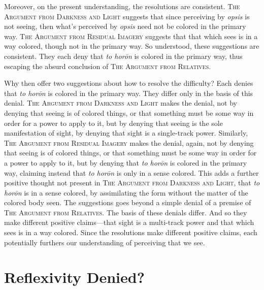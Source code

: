 Moreover, on the present understanding, the resolutions are consistent. \textsc{The Argument from Darkness and Light} suggests that since perceiving by \emph{opsis} is not seeing, then what's perceived by \emph{opsis} need not be colored in the primary way. \textsc{The Argument from Residual Imagery} suggests that that which sees is in a way colored, though not in the primary way. So understood, these suggestions are consistent. They each deny that \emph{to horōn} is colored in the primary way, thus escaping the absurd conclusion of \textsc{The Argument from Relatives}.

Why then offer two suggestions about how to resolve the difficulty? Each denies that \emph{to horōn} is colored in the primary way. They differ only in the basis of this denial. \textsc{The Argument from Darkness and Light} makes the denial, not by denying that seeing is of colored things, or that something must be some way in order for a power to apply to it, but by denying that seeing is the sole manifestation of sight, by denying that sight is a single-track power. Similarly, \textsc{The Argument from Residual Imagery} makes the denial, again, not by denying that seeing is of colored things, or that something must be some way in order for a power to apply to it, but by denying that \emph{to horōn} is colored in the primary way, claiming instead that \emph{to horōn} is only in a sense colored. This adds a further positive thought not present in \textsc{The Argument from Darkness and Light}, that \emph{to horōn} is in a sense colored, by assimilating the form without the matter of the colored body seen. The suggestions goes beyond a simple denial of a premise of \textsc{The Argument from Relatives}. The basis of these denials differ. And so they make different positive claims—that sight is a multi-track power and that which sees is in a way colored. Since the resolutions make different positive claims, each potentially furthers our understanding of perceiving that we see.



\section{Reflexivity Denied?} %
\label{sec:potential_objections}

